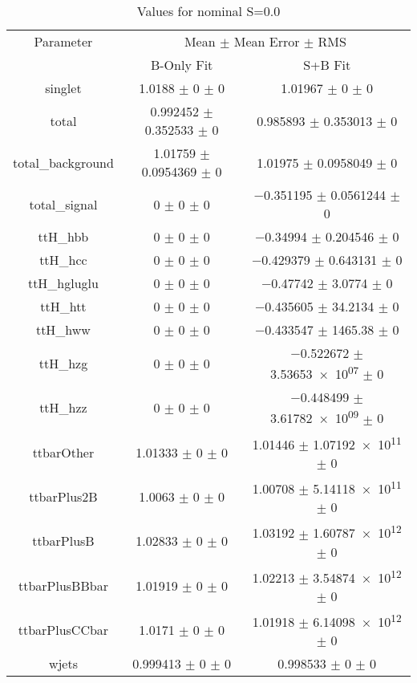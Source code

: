 \begin{table}
\centering
\caption{Values for nominal S=0.0}
\begin{tabular}{ccc}
\toprule
Parameter & \multicolumn{2}{c}{Mean $\pm$ Mean Error $\pm$ RMS}\\
 & B-Only Fit & S+B Fit\\
\midrule
singlet & \num{1.0188} $\pm$ \num{0} $\pm$ \num{0} & \num{1.01967} $\pm$ \num{0} $\pm$ \num{0}\\
total & \num{0.992452} $\pm$ \num{0.352533} $\pm$ \num{0} & \num{0.985893} $\pm$ \num{0.353013} $\pm$ \num{0}\\
total\_background & \num{1.01759} $\pm$ \num{0.0954369} $\pm$ \num{0} & \num{1.01975} $\pm$ \num{0.0958049} $\pm$ \num{0}\\
total\_signal & \num{0} $\pm$ \num{0} $\pm$ \num{0} & \num{-0.351195} $\pm$ \num{0.0561244} $\pm$ \num{0}\\
ttH\_hbb & \num{0} $\pm$ \num{0} $\pm$ \num{0} & \num{-0.34994} $\pm$ \num{0.204546} $\pm$ \num{0}\\
ttH\_hcc & \num{0} $\pm$ \num{0} $\pm$ \num{0} & \num{-0.429379} $\pm$ \num{0.643131} $\pm$ \num{0}\\
ttH\_hgluglu & \num{0} $\pm$ \num{0} $\pm$ \num{0} & \num{-0.47742} $\pm$ \num{3.0774} $\pm$ \num{0}\\
ttH\_htt & \num{0} $\pm$ \num{0} $\pm$ \num{0} & \num{-0.435605} $\pm$ \num{34.2134} $\pm$ \num{0}\\
ttH\_hww & \num{0} $\pm$ \num{0} $\pm$ \num{0} & \num{-0.433547} $\pm$ \num{1465.38} $\pm$ \num{0}\\
ttH\_hzg & \num{0} $\pm$ \num{0} $\pm$ \num{0} & \num{-0.522672} $\pm$ \num{3.53653e+07} $\pm$ \num{0}\\
ttH\_hzz & \num{0} $\pm$ \num{0} $\pm$ \num{0} & \num{-0.448499} $\pm$ \num{3.61782e+09} $\pm$ \num{0}\\
ttbarOther & \num{1.01333} $\pm$ \num{0} $\pm$ \num{0} & \num{1.01446} $\pm$ \num{1.07192e+11} $\pm$ \num{0}\\
ttbarPlus2B & \num{1.0063} $\pm$ \num{0} $\pm$ \num{0} & \num{1.00708} $\pm$ \num{5.14118e+11} $\pm$ \num{0}\\
ttbarPlusB & \num{1.02833} $\pm$ \num{0} $\pm$ \num{0} & \num{1.03192} $\pm$ \num{1.60787e+12} $\pm$ \num{0}\\
ttbarPlusBBbar & \num{1.01919} $\pm$ \num{0} $\pm$ \num{0} & \num{1.02213} $\pm$ \num{3.54874e+12} $\pm$ \num{0}\\
ttbarPlusCCbar & \num{1.0171} $\pm$ \num{0} $\pm$ \num{0} & \num{1.01918} $\pm$ \num{6.14098e+12} $\pm$ \num{0}\\
wjets & \num{0.999413} $\pm$ \num{0} $\pm$ \num{0} & \num{0.998533} $\pm$ \num{0} $\pm$ \num{0}\\
\bottomrule
\end{tabular}
\end{table}